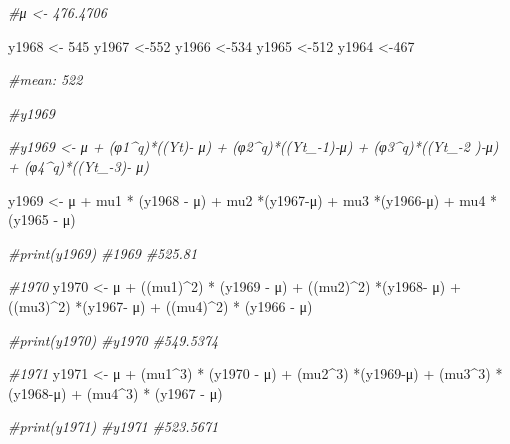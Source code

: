 \documentclass[
]{article}
\newenvironment{Shaded}{\begin{snugshade}}{\end{snugshade}}
\newcommand{\CommentTok}[1]{\textcolor[rgb]{0.56,0.35,0.01}{\textit{#1}}}
\newcommand{\DecValTok}[1]{\textcolor[rgb]{0.00,0.00,0.81}{#1}}
\newcommand{\NormalTok}[1]{#1}
\newcommand{\OtherTok}[1]{\textcolor[rgb]{0.56,0.35,0.01}{#1}}
\newcommand{\SpecialCharTok}[1]{\textcolor[rgb]{0.00,0.00,0.00}{#1}}
\begin{document}
\begin{Shaded}
\begin{Highlighting}[]
\CommentTok{\#μ \textless{}{-} 476.4706}

\NormalTok{y1968 }\OtherTok{\textless{}{-}} \DecValTok{545}
\NormalTok{y1967 }\OtherTok{\textless{}{-}}\DecValTok{552}
\NormalTok{y1966 }\OtherTok{\textless{}{-}}\DecValTok{534}
\NormalTok{y1965 }\OtherTok{\textless{}{-}}\DecValTok{512}
\NormalTok{y1964 }\OtherTok{\textless{}{-}}\DecValTok{467}

\CommentTok{\#mean: 522}

\CommentTok{\#y1969}

\CommentTok{\#y1969 \textless{}{-} μ + (φ1\^{}q)*((Yt){-} μ) + (φ2\^{}q)*((Yt\_{-}1){-}μ) + (φ3\^{}q)*((Yt\_{-}2 ){-}μ) + (φ4\^{}q)*((Yt\_{-}3){-} μ)}

\NormalTok{y1969 }\OtherTok{\textless{}{-}}\NormalTok{ μ }\SpecialCharTok{+}\NormalTok{ mu1 }\SpecialCharTok{*}\NormalTok{ (y1968 }\SpecialCharTok{{-}}\NormalTok{ μ) }\SpecialCharTok{+}\NormalTok{ mu2 }\SpecialCharTok{*}\NormalTok{(y1967}\SpecialCharTok{{-}}\NormalTok{μ) }\SpecialCharTok{+}\NormalTok{ mu3 }\SpecialCharTok{*}\NormalTok{(y1966}\SpecialCharTok{{-}}\NormalTok{μ) }\SpecialCharTok{+}\NormalTok{ mu4 }\SpecialCharTok{*}\NormalTok{ (y1965 }\SpecialCharTok{{-}}\NormalTok{ μ)}

\CommentTok{\#print(y1969)}
\CommentTok{\#1969}
\CommentTok{\#525.81}

\CommentTok{\#1970}
\NormalTok{y1970 }\OtherTok{\textless{}{-}}\NormalTok{  μ }\SpecialCharTok{+}\NormalTok{ ((mu1)}\SpecialCharTok{\^{}}\DecValTok{2}\NormalTok{) }\SpecialCharTok{*}\NormalTok{ (y1969 }\SpecialCharTok{{-}}\NormalTok{ μ) }\SpecialCharTok{+}\NormalTok{ ((mu2)}\SpecialCharTok{\^{}}\DecValTok{2}\NormalTok{) }\SpecialCharTok{*}\NormalTok{(y1968}\SpecialCharTok{{-}}\NormalTok{ μ) }\SpecialCharTok{+}\NormalTok{ ((mu3)}\SpecialCharTok{\^{}}\DecValTok{2}\NormalTok{) }\SpecialCharTok{*}\NormalTok{(y1967}\SpecialCharTok{{-}}\NormalTok{ μ) }\SpecialCharTok{+}\NormalTok{ ((mu4)}\SpecialCharTok{\^{}}\DecValTok{2}\NormalTok{) }\SpecialCharTok{*}\NormalTok{ (y1966 }\SpecialCharTok{{-}}\NormalTok{ μ)}

\CommentTok{\#print(y1970)}
\CommentTok{\#y1970}
\CommentTok{\#549.5374}

\CommentTok{\#1971}
\NormalTok{y1971 }\OtherTok{\textless{}{-}}\NormalTok{  μ }\SpecialCharTok{+}\NormalTok{ (mu1}\SpecialCharTok{\^{}}\DecValTok{3}\NormalTok{) }\SpecialCharTok{*}\NormalTok{ (y1970 }\SpecialCharTok{{-}}\NormalTok{ μ) }\SpecialCharTok{+}\NormalTok{ (mu2}\SpecialCharTok{\^{}}\DecValTok{3}\NormalTok{) }\SpecialCharTok{*}\NormalTok{(y1969}\SpecialCharTok{{-}}\NormalTok{μ) }\SpecialCharTok{+}\NormalTok{ (mu3}\SpecialCharTok{\^{}}\DecValTok{3}\NormalTok{) }\SpecialCharTok{*}\NormalTok{(y1968}\SpecialCharTok{{-}}\NormalTok{μ) }\SpecialCharTok{+}\NormalTok{ (mu4}\SpecialCharTok{\^{}}\DecValTok{3}\NormalTok{) }\SpecialCharTok{*}\NormalTok{ (y1967 }\SpecialCharTok{{-}}\NormalTok{ μ)}

\CommentTok{\#print(y1971)}
\CommentTok{\#y1971}
\CommentTok{\#523.5671}
\end{Highlighting}
\end{Shaded}
\end{document}
